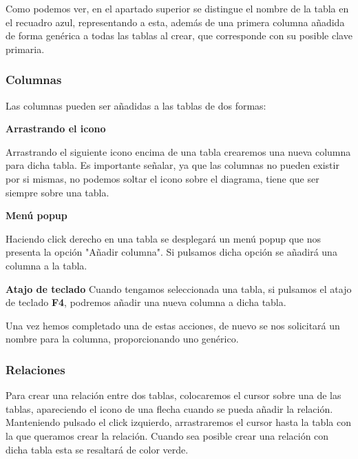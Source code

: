 
Como podemos ver, en el apartado superior se distingue el nombre de la tabla en el recuadro azul, representando a esta, además de una primera columna añadida de forma genérica a todas las tablas al crear, que corresponde con su posible clave primaria.

\subsubsection{Columnas}
Las columnas pueden ser añadidas a las tablas de dos formas:

\textbf{Arrastrando el icono}


Arrastrando el siguiente icono encima de una tabla crearemos una nueva columna para dicha tabla. Es importante señalar, ya que las columnas no pueden existir por si mismas, no podemos soltar el icono sobre el diagrama, tiene que ser siempre sobre una tabla.

\textbf{Menú popup}


Haciendo click derecho en una tabla se desplegará un menú popup que nos presenta la opción "Añadir columna". Si pulsamos dicha opción se añadirá una columna a la tabla.

\textbf{Atajo de teclado}
Cuando tengamos seleccionada una tabla, si pulsamos el atajo de teclado \textbf{F4}, podremos añadir una nueva columna a dicha tabla.


Una vez hemos completado una de estas acciones, de nuevo se nos solicitará un nombre para la columna, proporcionando uno genérico.

\subsubsection{Relaciones}
Para crear una relación entre dos tablas, colocaremos el cursor sobre una de las tablas, apareciendo el icono de una flecha cuando se pueda añadir la relación. Manteniendo pulsado el click izquierdo, arrastraremos el cursor hasta la tabla con la que queramos crear la relación. Cuando sea posible crear una relación con dicha tabla esta se resaltará de color verde.



